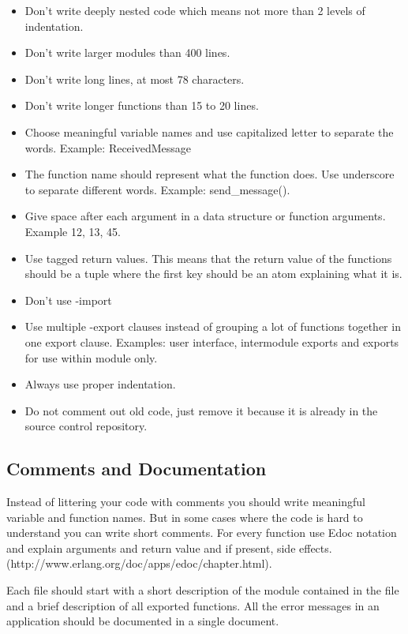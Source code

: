 \documentclass[12pt]{article}
\begin{document}
\begin{itemize}

\item Don’t write deeply nested code which means not more than 2 levels of indentation. 
\item Don’t write larger modules than 400 lines. 
\item Don’t write long lines, at most 78 characters.
\item Don’t write longer functions than 15 to 20 lines. 
\item Choose meaningful variable names and use capitalized letter to separate the words. Example: ReceivedMessage
\item The function name should represent what the function does. Use underscore to separate different words. Example: send\_message().
\item Give space after each argument in a data structure or function arguments. Example {12, 13, 45}.
\item Use tagged return values. This means that the return value of the functions should be a tuple where the first key should be an atom explaining what it is.  
\item Don't use -import
\item Use multiple -export clauses instead of grouping a lot of functions together in one export clause. Examples:  user interface, intermodule exports and exports for use within module only. 
\item Always use proper indentation.
\item Do not comment out old code, just remove it because it is already in the source control repository.  
\end{itemize}
  
\subsection{Comments and Documentation}
Instead of littering your code with comments you should write meaningful variable and function names. But in some cases where the code is hard to understand you can write short comments. For every function use Edoc notation and explain arguments and return value and if present, side effects. (http://www.erlang.org/doc/apps/edoc/chapter.html).  

Each file should start with a short description of the module contained in the file and a brief description of all exported functions. All the error messages in an application should be documented in a single document.  
\end{document}
